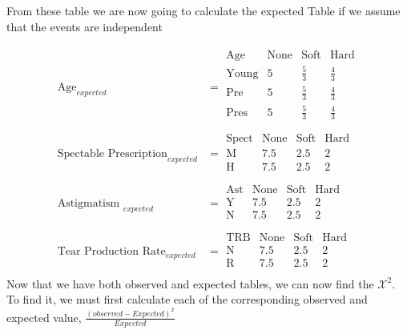 \documentclass[12pt,english]{article}
\begin{document}
From these table we are now going to calculate the expected Table if we assume that the events are independent

\begin{equation}\tag{2}\label{eq:2}
\begin{split}
\mbox{Age}_{expected} &= 
\begin{array}{c|ccc}
\mbox{Age}   & \mbox{None} & \mbox{Soft} & \mbox{Hard}\\
\hline
\mbox{Young} & 5 & \frac{5}{3} & \frac{4}{3}\\
\mbox{Pre}   & 5 & \frac{5}{3} & \frac{4}{3}\\
\mbox{Pres}  & 5 & \frac{5}{3} & \frac{4}{3}\\
\end{array}
\\
\mbox{Spectable Prescription}_{expected} &= 
\begin{array}{c|ccc}
\mbox{Spect} & \mbox{None} & \mbox{Soft} & \mbox{Hard}\\
\hline
\mbox{M}     & 7.5 & 2.5 & 2 \\
\mbox{H}     & 7.5 & 2.5 & 2 \\
\end{array}
\\
\mbox{Astigmatism }_{expected} &=
\begin{array}{c|ccc}
\mbox{Ast}   & \mbox{None} & \mbox{Soft} & \mbox{Hard}\\
\hline
\mbox{Y}     & 7.5 & 2.5 & 2 \\
\mbox{N}     & 7.5 & 2.5 & 2 \\
\end{array}
\\
\mbox{Tear Production Rate}_{expected} &=
\begin{array}{c|ccc}
\mbox{TRB}   & \mbox{None} & \mbox{Soft} & \mbox{Hard}\\
\hline
\mbox{N}     & 7.5 & 2.5 & 2 \\
\mbox{R}     & 7.5 & 2.5 & 2 \\
\end{array}
\end{split}
\end{equation}
Now that we have both observed and expected tables, we can now find the $\mathcal{X}^2$. To find it, we must first calculate each of the corresponding observed and expected value, $\frac{(observed - Expected)^2}{Expected}$
\end{document}
